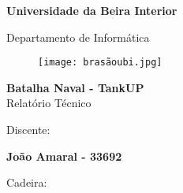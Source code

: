 
\thispagestyle{empty}
\setcounter{page}{-1}

\begin{center}
\begin{Huge}
\textbf{Universidade da Beira Interior}
\end{Huge}
\end{center}

\begin{center}
\begin{Huge}
Departamento de Informática
\end{Huge}
\end{center}

\vspace{0,07cm}
\begin{figure}[!htb]
\centering
\texttt{[image: brasãoubi.jpg]}
\end{figure}

\vspace{0.5cm}
\begin{center}
\begin{Large}
\textbf{Batalha Naval - TankUP}\\
Relatório Técnico
\end{Large}
\end{center}

\vspace{0.3cm}
\begin{center}
\begin{normalsize}
\begin{large}
Discente:
\end{large}
\end{normalsize}
\end{center}

\vspace{0.2cm}
\begin{center}
\begin{large}

\textbf{João Amaral - 33692}\\

\end{large}
\end{center}

\vspace{0,4cm}
\begin{center}
\begin{normalsize}
\begin{large}
Cadeira:
\end{large}
\end{normalsize}
\end{center}

